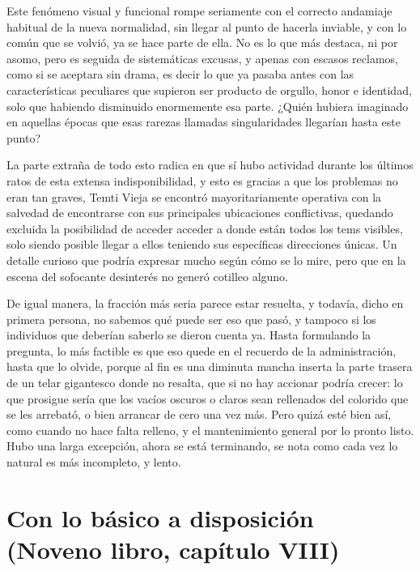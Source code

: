 \documentclass[
]{book}
\begin{document}
Este fenómeno visual y funcional rompe seriamente con el correcto andamiaje habitual de la nueva normalidad, sin llegar al punto de hacerla inviable, y con lo común que se volvió, ya se hace parte de ella. No es lo que más destaca, ni por asomo, pero es seguida de sistemáticas excusas, y apenas con escasos reclamos, como si se aceptara sin drama, es decir lo que ya pasaba antes con las características peculiares que supieron ser producto de orgullo, honor e identidad, solo que habiendo disminuido enormemente esa parte. ¿Quién hubiera imaginado en aquellas épocas que esas rarezas llamadas singularidades llegarían hasta este punto?

La parte extraña de todo esto radica en que sí hubo actividad durante los últimos ratos de esta extensa indisponibilidad, y esto es gracias a que los problemas no eran tan graves, Temti Vieja se encontró mayoritariamente operativa con la salvedad de encontrarse con sus principales ubicaciones conflictivas, quedando excluida la posibilidad de acceder acceder a donde están todos los tems visibles, solo siendo posible llegar a ellos teniendo sus específicas direcciones únicas. Un detalle curioso que podría expresar mucho según cómo se lo mire, pero que en la escena del sofocante desinterés no generó cotilleo alguno.

De igual manera, la fracción más seria parece estar resuelta, y todavía, dicho en primera persona, no sabemos qué puede ser eso que pasó, y tampoco si los individuos que deberían saberlo se dieron cuenta ya. Hasta formulando la pregunta, lo más factible es que eso quede en el recuerdo de la administración, hasta que lo olvide, porque al fin es una diminuta mancha inserta la parte trasera de un telar gigantesco donde no resalta, que si no hay accionar podría crecer: lo que prosigue sería que los vacíos oscuros o claros sean rellenados del colorido que se les arrebató, o bien arrancar de cero una vez más. Pero quizá esté bien así, como cuando no hace falta relleno, y el mantenimiento general por lo pronto listo. Hubo una larga excepción, ahora se está terminando, se nota como cada vez lo natural es más incompleto, y lento.

\hypertarget{con-lo-buxe1sico-a-disposiciuxf3n-noveno-libro-capuxedtulo-viii}{%
\section{Con lo básico a disposición (Noveno libro, capítulo VIII)}\label{con-lo-buxe1sico-a-disposiciuxf3n-noveno-libro-capuxedtulo-viii}}
\end{document}
